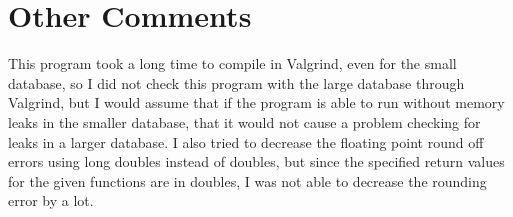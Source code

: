 \documentclass[11pt]{article}
\begin{document}
\section{Other Comments}\label{ss:comments}
This program took a long time to compile in Valgrind, even for the small database, so I did not check this program with the large database through Valgrind, but I would assume that if the program is able to run without memory leaks in the smaller database, that it would not cause a problem checking for leaks in a larger database. I also tried to decrease the floating point round off errors using long doubles instead of doubles, but since the specified return values for the given functions are in doubles, I was not able to decrease the rounding error by a lot.
\end{document}
